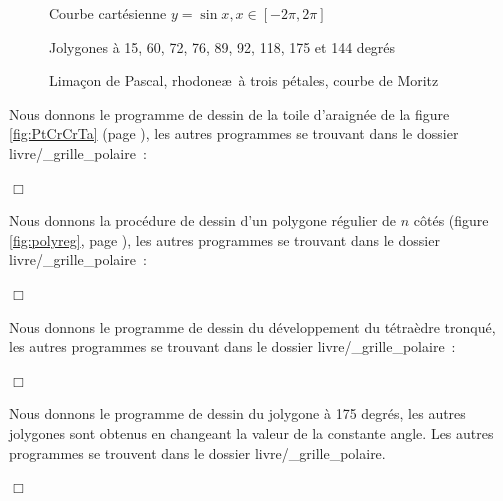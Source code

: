 \begin{figure}[htbp]
 \caption{Courbe cartésienne $y = \sin{x}, x \in [-2\pi, 2\pi]$}\label{fig:sin}
\end{figure}
\begin{figure}[htbp]
 \caption{Jolygones à 15, 60, 72, 76, 89, 92, 118, 175 et 144 degrés}\label{fig:jgones}
\end{figure}
\begin{figure}[htbp]
 \caption{Limaçon de Pascal, rhodone\ae\ à trois pétales, courbe de Moritz}\label{fig:courbpo}
\end{figure}
\begin{corrige}{
Nous donnons le programme de dessin de la toile d'araignée de la figure \ref{fig:PtCrCrTa} 
(page \pageref{fig:PtCrCrTa}), les autres programmes se trouvant dans le dossier
{\idt livre/\_grille\_polaire}~:

\noindent $\Box$}\end{corrige}
\begin{corrige}{
Nous donnons la procédure de dessin d'un polygone régulier de $n$ côtés (figure \ref{fig:polyreg}, 
page \pageref{fig:polyreg}), les autres programmes se trouvant  dans le dossier
{\idt livre/\_grille\_polaire}~:

\noindent $\Box$}\end{corrige}
\begin{corrige}{
Nous donnons le programme de dessin du développement du té\-traè\-dre tron\-qué, les autres 
programmes se trouvant  dans le dossier {\idt livre/\_grille\_polaire}~:

\noindent $\Box$}\end{corrige}
\begin{corrige}{
Nous donnons le programme de dessin du jolygone à 175 degrés, les autres jolygones sont obtenus en changeant la
valeur de la constante {\idt angle}. Les autres programmes se trouvent  dans le dossier
{\idt livre/\_grille\_polaire}.

\noindent $\Box$}\end{corrige}

\clearpage


